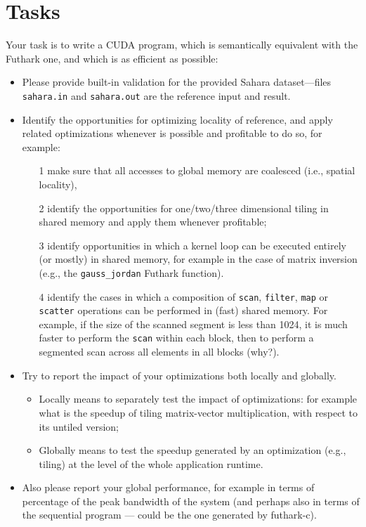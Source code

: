 \documentclass[a4paper,11pt]{article}
\begin{document}
\section{Tasks}

Your task is to write a CUDA program, which is semantically equivalent
with the Futhark one, and which is as efficient as possible:
\begin{itemize}
    \item Please provide built-in validation for the provided Sahara 
            dataset---files {\tt sahara.in} and {\tt sahara.out} are the 
            reference input and result.
    \item Identify the opportunities for optimizing locality of reference,
        and apply related optimizations whenever is possible and profitable
        to do so, for example:
            \begin{itemize} 
            \item[1] make sure that all accesses to global memory are coalesced
                        (i.e., spatial locality),
            \item[2] identify the opportunities for one/two/three dimensional 
                tiling in shared memory and apply them whenever profitable;
            \item[3] identify opportunities in which a kernel loop can be 
                executed entirely (or mostly) in shared memory, for example
                in the case of matrix inversion (e.g., the {\tt gauss\_jordan} 
                Futhark function).
            \item[4] identify the cases in which a composition of {\tt scan}, 
                {\tt filter}, {\tt map} or {\tt scatter} operations can be
                performed in (fast) shared memory. For example, if the size
                of the scanned segment is less than 1024, it is much faster to
                perform the {\tt scan} within each block, then to perform
                a segmented scan across all elements in all blocks (why?). 
            \end{itemize}
    \item Try to report the impact of your optimizations both locally and
            globally.
        \begin{itemize}
            \item Locally means to separately test the impact of optimizations:
            for example what is the speedup of tiling matrix-vector multiplication, 
            with respect to its untiled version;
            \item Globally means to test the speedup generated by an optimization
            (e.g., tiling) at the level of the whole application runtime. 
        \end{itemize}
    \item Also please report your global performance, for example in terms of 
            percentage of the peak bandwidth of the system (and perhaps also in 
            terms of the sequential program --- could be the one generated 
            by futhark-c).
\end{itemize}
\end{document}
